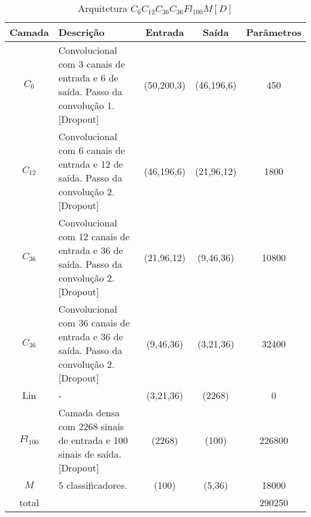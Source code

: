 \noindent
\begin{table}[!p]
	\begin{center}
		\caption{Arquitetura $C_6C_{12}C_{36}C_{36}Fl_{100}M[D]$}
		\label{tab_ccccfmd}
	\end{center}
\begin{tabularx}{\linewidth}{ |c|X|c|c|c| }
	\hline
	Camada & Descrição & Entrada & Saída & Parâmetros \\ \hline \hline
	$C_{6}$ & Convolucional com 3 canais de entrada e 6 de saída. Passo da convolução 1.  [Dropout] & (50,200,3) & (46,196,6) & 450 \\ \hline
	$C_{12}$ & Convolucional com 6 canais de entrada e 12 de saída. Passo da convolução 2.  [Dropout] & (46,196,6) & (21,96,12) & 1800 \\ \hline
	$C_{36}$ & Convolucional com 12 canais de entrada e 36 de saída. Passo da convolução 2.  [Dropout] & (21,96,12) & (9,46,36) & 10800 \\ \hline
	$C_{36}$ & Convolucional com 36 canais de entrada e 36 de saída. Passo da convolução 2.  [Dropout] & (9,46,36) & (3,21,36) & 32400 \\ \hline
	Lin & - & (3,21,36) & (2268) & 0 \\ \hline
	$Fl_{100}$ & Camada densa com 2268 sinais de entrada e 100 sinais de saída.  [Dropout] & (2268) & (100) & 226800 \\ \hline
	$M$ & 5 classificadores. & (100) & (5,36) & 18000 \\ \hline
	total &  &  &  & 290250 \\ \hline
\end{tabularx}
\end{table}
